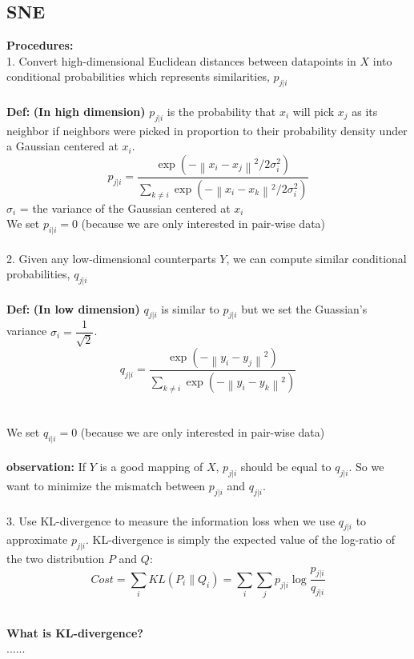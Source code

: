 \documentclass[runningheads]{llncs}
\begin{document}
		\subsection{SNE}
		\textbf{Procedures:} 
		\\
		1. Convert high-dimensional Euclidean distances between datapoints in $X$ into conditional probabilities which represents similarities, $p_{j|i}$ \\
		\\
		\textbf{Def:} \textbf{(In high dimension)} $p_{j | i}$ is the probability that $x_i$ will pick $x_j$ as its neighbor if neighbors were picked in proportion to their probability density under a Gaussian centered at $x_i$.
		$$p_{j | i}=\frac{\exp \left(-\left\|x_{i}-x_{j}\right\|^{2} / 2 \sigma_{i}^{2}\right)}{\sum_{k \neq i} \exp \left(-\left\|x_{i}-x_{k}\right\|^{2} / 2 \sigma_{i}^{2}\right)}$$
		$\sigma_i$ = the variance of the Gaussian centered at $x_i$\\
		We set $p_{i|i} = 0$ (because we are only interested in pair-wise data)\\
		\\
		2. Given any low-dimensional counterparts $Y$, we can compute similar conditional probabilities, $q_{j|i}$\\
		\\
		\textbf{Def:} \textbf{(In low dimension)} $q_{j | i}$ is similar to $p_{j|i}$ but we set the Guassian's variance $\sigma_{i} = \dfrac{1}{\sqrt{2}}$. 
		$$q_{j | i}=\frac{\exp \left(-\left\|y_{i}-y_{j}\right\|^{2}\right)}{\sum_{k \neq i} \exp \left(-\left\|y_{i}-y_{k}\right\|^{2}\right)}$$\\
		\\
		We set $q_{i|i} = 0$ (because we are only interested in pair-wise data)\\
		\\
		\textbf{observation: }If $Y$ is a good mapping of $X$,  $p_{j|i}$ should be equal to $q_{j|i}$. So we want to minimize the mismatch between $p_{j|i}$ and $q_{j|i}.$\\
		\\
		3. Use KL-divergence to measure the information loss when we use $q_{j|i}$ to approximate $p_{j|i}$.  KL-divergence is simply the expected value of the log-ratio of the two distribution $P$ and $Q$:
		$$Cost=\sum_{i} K L\left(P_{i} \| Q_{i}\right)=\sum_{i} \sum_{j} p_{j | i} \log \frac{p_{j | i} }{q_{j | i} }$$\\
		\begin{mdframed}
			\textbf{What is KL-divergence?}\\
			......
			\end{mdframed}
\end{document}
